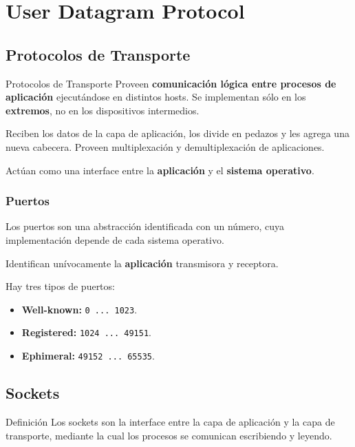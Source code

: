 \section{User Datagram Protocol}

\subsection{Protocolos de Transporte}

\begin{definicion}{Protocolos de Transporte} 
    Proveen \textbf{comunicación lógica entre procesos de aplicación} ejecutándose en distintos hosts. Se implementan sólo en los \textbf{extremos}, no en los dispositivos intermedios. 

    Reciben los datos de la capa de aplicación, los divide en pedazos y les agrega una nueva cabecera. Proveen multiplexación y demultiplexación de aplicaciones.
    
    Actúan como una interface entre la \textbf{aplicación} y el \textbf{sistema operativo}.
\end{definicion} 

\subsubsection{Puertos}

Los puertos son una abstracción identificada con un número, cuya implementación depende de cada sistema operativo. 

Identifican unívocamente la \textbf{aplicación} transmisora y receptora. 

Hay tres tipos de puertos:

\begin{itemize}[label=\textcolor{acento}{$\bullet$}]
    \item \textbf{Well-known:} \texttt{0 ... 1023}.
    \item \textbf{Registered:} \texttt{1024 ... 49151}.
    \item \textbf{Ephimeral:} \texttt{49152 ... 65535}.
\end{itemize}

\subsection{Sockets}

\begin{definicion}{Definición}
    Los sockets son la interface entre la capa de aplicación y la capa de transporte, mediante la cual los procesos se comunican escribiendo y leyendo.
\end{definicion}

